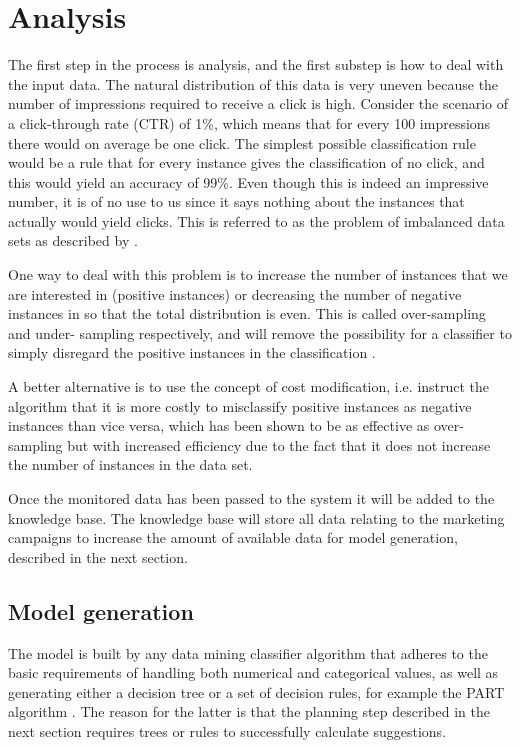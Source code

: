 \documentclass[11pt,a4paper]{report}
\begin{document}
\section{Analysis}
The first step in the process is analysis, and the first substep is how to deal with the input data. The natural distribution of this data is very uneven because the number of impressions required to receive a click is high. Consider the scenario of a click-through rate (CTR) of 1\%, which means that for every 100 impressions there would on average be one click. The simplest possible classification rule would be a rule that for every instance gives the classification of no click, and this would yield an accuracy of 99\%. Even though this is indeed an impressive number, it is of no use to us since it says nothing about the instances that actually would yield clicks. This is referred to as the problem of imbalanced data sets as described by \citet{Chawla2004}.

One way to deal with this problem is to increase the number of instances that we are interested in (positive instances) or decreasing the number of negative instances in so that the total distribution is even. This is called over-sampling and under- sampling respectively, and will remove the possibility for a classifier to simply disregard the positive instances in the classification \citep{Chawla2004, Japkowicz2002}.

A better alternative is to use the concept of cost modification, i.e. instruct the algorithm that it is more costly to misclassify positive instances as negative instances than vice versa, which has been shown to be as effective as over-sampling but with increased efficiency \citep{Chawla2004, Japkowicz2002} due to the fact that it does not increase the number of instances in the data set.

Once the monitored data has been passed to the system it will be added to the knowledge base. The knowledge base will store all data relating to the marketing campaigns to increase the amount of available data for model generation, described in the next section.

\subsection{Model generation}
The model is built by any data mining classifier algorithm that adheres to the basic requirements of handling both numerical and categorical values, as well as generating either a decision tree or a set of decision rules, for example the PART algorithm \citep{Frank1998}. The reason for the latter is that the planning step described in the next section requires trees or rules to successfully calculate suggestions.
\end{document}
